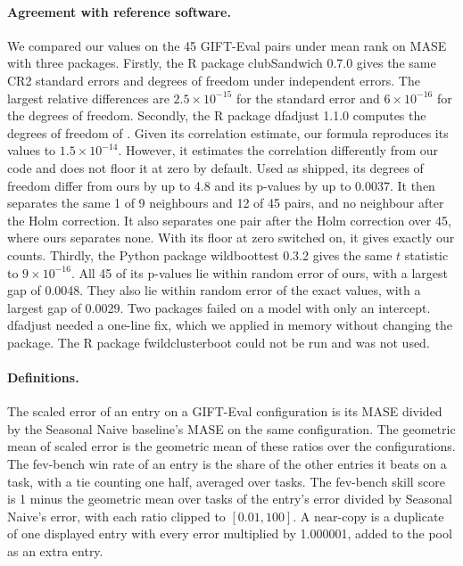 \documentclass{article}
\begin{document}
\paragraph{Agreement with reference software.} We compared our values on the 45 GIFT-Eval
pairs under mean rank on MASE with three packages. Firstly, the R package clubSandwich 0.7.0
\citep{pustejovskytipton2018} gives the same CR2 standard errors and degrees of freedom under
independent errors. The largest relative differences are $2.5\times10^{-15}$ for the standard
error and $6\times10^{-16}$ for the degrees of freedom. Secondly, the R package dfadjust 1.1.0
computes the degrees of freedom of \citet{imbenskolesar2016}. Given its correlation estimate,
our formula reproduces its values to $1.5\times10^{-14}$. However, it estimates the
correlation differently from our code and does not floor it at zero by default. Used as
shipped, its degrees of freedom differ from ours by up to 4.8 and its p-values by up to
0.0037. It then separates the same 1 of 9 neighbours and 12 of 45 pairs, and no neighbour after
the Holm correction. It also separates one pair after the Holm correction over 45, where ours
separates none. With its floor at zero switched on, it gives exactly our counts. Thirdly, the
Python package wildboottest 0.3.2 gives the same $t$ statistic to $9\times10^{-16}$. All 45
of its p-values lie within random error of ours, with a largest gap of 0.0048. They also lie
within random error of the exact values, with a largest gap of 0.0029. Two packages failed on
a model with only an intercept. dfadjust needed a one-line fix, which we applied in memory
without changing the package. The R package fwildclusterboot could not be run and was not
used.

\paragraph{Definitions.} The scaled error of an entry on a GIFT-Eval configuration is its MASE
divided by the Seasonal Naive baseline's MASE on the same configuration. The geometric mean of
scaled error is the geometric mean of these ratios over the configurations. The fev-bench win
rate of an entry is the share of the other entries it beats on a task, with a tie counting one
half, averaged over tasks. The fev-bench skill score is 1 minus the geometric mean over tasks
of the entry's error divided by Seasonal Naive's error, with each ratio clipped to
$[0.01, 100]$. A near-copy is a duplicate of one displayed entry with every error multiplied
by 1.000001, added to the pool as an extra entry.
\end{document}
